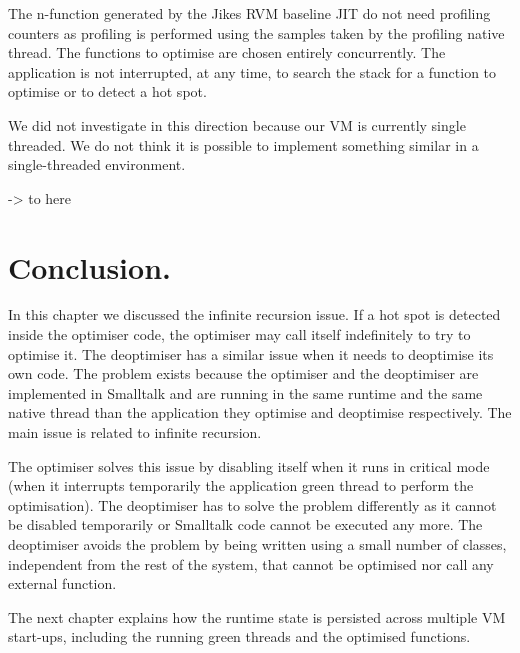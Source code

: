 \documentclass[a4paper,12pt,twoside]{../includes/ThesisStyle}
\begin{document}
The n-function generated by the Jikes RVM baseline JIT do not need profiling counters as profiling is performed using the samples taken by the profiling native thread. The functions to optimise are chosen entirely concurrently. The application is not interrupted, at any time, to search the stack for a function to optimise or to detect a hot spot.

We did not investigate in this direction because our VM is currently single threaded. We do not think it is possible to implement something similar in a single-threaded environment.

-> to here


\section{Conclusion.}

In this chapter we discussed the infinite recursion issue. If a hot spot is detected inside the optimiser code, the optimiser may call itself indefinitely to try to optimise it. The deoptimiser has a similar issue when it needs to deoptimise its own code. The problem exists because the optimiser and the deoptimiser are implemented in Smalltalk and are running in the same runtime and the same native thread than the application they optimise and deoptimise respectively. The main issue is related to infinite recursion.

The optimiser solves this issue by disabling itself when it runs in critical mode (when it interrupts temporarily the application green thread to perform the optimisation). %
The deoptimiser has to solve the problem differently as it cannot be disabled temporarily or Smalltalk code cannot be executed any more. The deoptimiser avoids the problem by being written using a small number of classes, independent from the rest of the system, that cannot be optimised nor call any external function.

The next chapter explains how the runtime state is persisted across multiple VM start-ups, including the running green threads and the optimised functions.

\ifx\wholebook\relax\else
    
\end{document}
